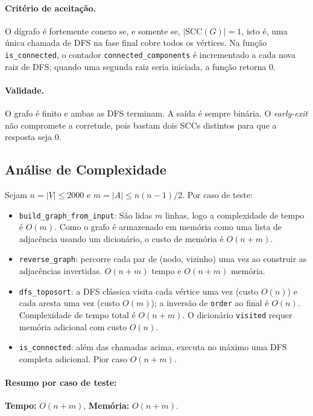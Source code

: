 \documentclass[11pt,a4paper]{article}
\begin{document}
\paragraph{Critério de aceitação.} O dígrafo é fortemente conexo
se, e somente se, $|\mathrm{SCC}(G)| = 1$, isto é, uma única
chamada de DFS na fase final cobre todos os vértices. Na função
\texttt{is\_connected}, o contador \texttt{connected\_components}
é incrementado a cada nova raiz de DFS; quando uma segunda raiz
seria iniciada, a função retorna $0$.

\paragraph{Validade.} O grafo é finito e ambas as DFS terminam.
A saída é sempre binária. O \emph{early-exit} não compromete a
corretude, pois bastam dois SCCs distintos para que a resposta seja
$0$.

\subsection{Análise de Complexidade}

Sejam $n = |V| \le 2000$ e $m = |A| \le n(n-1)/2$. Por caso de
teste:

\begin{itemize}
    \item \texttt{build\_graph\_from\_input}: São lidas $m$ linhas, logo a complexidade de tempo é $O(m)$. Como o grafo é armazenado em memória como uma lista de adjacência usando um dicionário, o custo de memória é $O(n+m)$.
    \item \texttt{reverse\_graph}: percorre cada par de (nodo, vizinho) uma vez ao construir as adjacências invertidas. $O(n+m)$ tempo
    e $O(n+m)$ memória.
    \item \texttt{dfs\_toposort}: a DFS clássica visita cada vértice
    uma vez (custo $O(n)$) e cada aresta uma vez (custo $O(m)$);
    a inversão de \texttt{order} ao final é $O(n)$. Complexidade de tempo total é $O(n+m)$. 
    O dicionário \texttt{visited} requer memória adicional com custo $O(n)$.
    \item \texttt{is\_connected}: além das chamadas acima, executa
    no máximo uma DFS completa adicional. Pior caso $O(n+m)$.
\end{itemize}

\paragraph{Resumo por caso de teste:} \textbf{Tempo:} $O(n+m)$,
\textbf{Memória:} $O(n+m)$.
\end{document}
